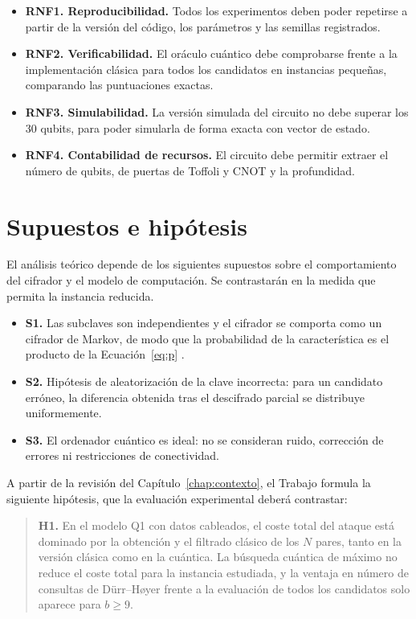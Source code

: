 \begin{itemize}
 \item \textbf{RNF1. Reproducibilidad.} Todos los experimentos deben poder repetirse a partir de la versión del código, los parámetros y las semillas registrados.
 \item \textbf{RNF2. Verificabilidad.} El oráculo cuántico debe comprobarse frente a la implementación clásica para todos los candidatos en instancias pequeñas, comparando las puntuaciones exactas.
 \item \textbf{RNF3. Simulabilidad.} La versión simulada del circuito no debe superar los 30 qubits, para poder simularla de forma exacta con vector de estado.
 \item \textbf{RNF4. Contabilidad de recursos.} El circuito debe permitir extraer el número de qubits, de puertas de Toffoli y CNOT y la profundidad.
\end{itemize}

\section{Supuestos e hipótesis}

El análisis teórico depende de los siguientes supuestos sobre el comportamiento del cifrador y el modelo de computación. Se contrastarán en la medida que permita la instancia reducida.

\begin{itemize}
 \item \textbf{S1.} Las subclaves son independientes y el cifrador se comporta como un cifrador de Markov, de modo que la probabilidad de la característica es el producto de la Ecuación~\ref{eq:p} \citep{lai1991}.
 \item \textbf{S2.} Hipótesis de aleatorización de la clave incorrecta: para un candidato erróneo, la diferencia obtenida tras el descifrado parcial se distribuye uniformemente.
 \item \textbf{S3.} El ordenador cuántico es ideal: no se consideran ruido, corrección de errores ni restricciones de conectividad.
\end{itemize}

A partir de la revisión del Capítulo~\ref{chap:contexto}, el Trabajo formula la siguiente hipótesis, que la evaluación experimental deberá contrastar:

\begin{quote}
\textbf{H1.} En el modelo Q1 con datos cableados, el coste total del ataque está dominado por la obtención y el filtrado clásico de los \(N\) pares, tanto en la versión clásica como en la cuántica. La búsqueda cuántica de máximo no reduce el coste total para la instancia estudiada, y la ventaja en número de consultas de Dürr--Høyer frente a la evaluación de todos los candidatos solo aparece para \(b\ge 9\).
\end{quote}

